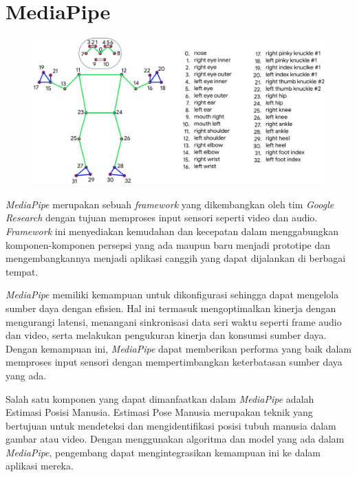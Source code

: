 \section{MediaPipe}
\begin{figure} [ht] \centering
  \includegraphics[scale=0.2]{gambar/humanpose.jpg}
  \label{fig:Pose Tubuh dari MediaPipe}
\end{figure}

\textit{MediaPipe} merupakan sebuah \textit{framework} yang dikembangkan oleh tim \textit{Google Research} dengan tujuan memproses input sensori seperti video dan audio. \textit{Framework} ini menyediakan kemudahan dan kecepatan dalam menggabungkan komponen-komponen persepsi yang ada maupun baru menjadi prototipe dan mengembangkannya menjadi aplikasi canggih yang dapat dijalankan di berbagai tempat. \cite{lugaresi2019mediapipe}

\textit{MediaPipe} memiliki kemampuan untuk dikonfigurasi sehingga dapat mengelola sumber daya dengan efisien. Hal ini termasuk mengoptimalkan kinerja dengan mengurangi latensi, menangani sinkronisasi data seri waktu seperti frame audio dan video, serta melakukan pengukuran kinerja dan konsumsi sumber daya. Dengan kemampuan ini, \textit{MediaPipe} dapat memberikan performa yang baik dalam memproses input sensori dengan mempertimbangkan keterbatasan sumber daya yang ada.

Salah satu komponen yang dapat dimanfaatkan dalam \textit{MediaPipe} adalah Estimasi Posisi Manusia. Estimasi Pose Manusia merupakan teknik yang bertujuan untuk mendeteksi dan mengidentifikasi posisi tubuh manusia dalam gambar atau video. Dengan menggunakan algoritma dan model yang ada dalam \textit{MediaPipe}, pengembang dapat mengintegrasikan kemampuan ini ke dalam aplikasi mereka.

